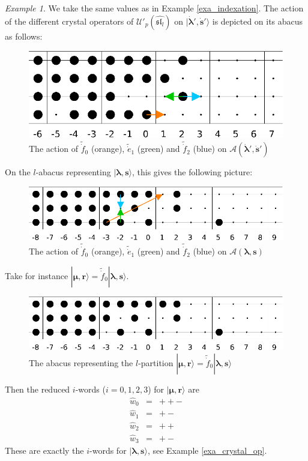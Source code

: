 \documentclass[twoside,12pt]{amsart}
\theoremstyle{plain}
\newcommand{\cA}{\mathcal{A}}
\newcommand{\br}{\mathbf{r}}
\newcommand{\bs}{\mathbf{s}}
\newcommand{\la}{\lambda}
\newcommand{\bla}{\boldsymbol{\la}}
\newcommand{\bmu}{\boldsymbol{\mu}}
\newcommand{\dbs}{\dot{\bs}}
\newcommand{\dbla}{\dot{\bla}}
\newcommand{\tde}{\tilde{\dot{e}}}
\newcommand{\tdf}{\tilde{\dot{f}}}
\newcommand{\hw}{\widehat{w}}
\newcommand{\Ul}{\mathcal{U}'_p (\widehat{\mathfrak{sl}_l})}
\theoremstyle{remark}
\newtheorem{exa}[num]{Example}
\begin{document}
\begin{exa}\label{exa_comm_crystals}
We take the same values as in Example \ref{exa_indexation}.
The action of the different crystal operators of $\Ul$ on $|\dbla',\dbs'\rangle$
is depicted on its abacus as follows:
\begin{figure}[H]
\includegraphics{images/abaque11.eps}
\caption{The action of $\tdf_0$ (orange),
$\tde_1$ (green) and $\tdf_2$ (blue) on
$\cA(\dbla',\dbs')$}
\label{ab11}
\end{figure}
On the $l$-abacus representing $|\bla,\bs\rangle$,
this gives the following picture:
\begin{figure}[H] 
\includegraphics{images/abaque12.eps}
\caption{The action of $\tdf_0$ (orange),
${\tde_1}$ (green) and ${\tdf_2}$ (blue) on
$\cA(\bla,\bs)$}
\label{ab12}
\end{figure}
Take for instance $|\bmu,\br\rangle = {\tdf_0}|\bla,\bs\rangle$.
\begin{figure}[H] 
\includegraphics{images/abaque13.eps}
\caption{The abacus representing the 
$l$-partition $|\bmu,\br\rangle = {\tdf_0}|\bla,\bs\rangle$}
\label{ab13}
\end{figure}
Then the reduced $i$-words ($i=0,1,2,3$) for $|\bmu,\br\rangle$ are
\begin{equation}
\begin{array}{ccl}
\hw_0 & = & ++- \\
\hw_1 & = & +- \\
\hw_2 & = & ++ \\
\hw_3 & = & +-
\end{array}
\end{equation}
These are exactly the $i$-words for $|\bla,\bs\rangle$,
see Example \ref{exa_crystal_op}.
\end{exa}
\end{document}
